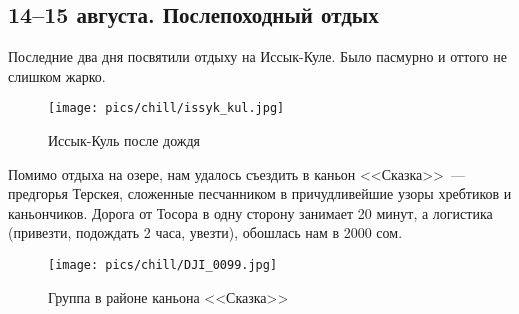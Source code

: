 \subsection{14--15 августа. Послепоходный отдых}

Последние два дня посвятили отдыху на Иссык-Куле. Было пасмурно и оттого не слишком жарко.

\begin{figure}[h!]
	\centering
	\texttt{[image: pics/chill/issyk\_kul.jpg]}
	\caption{Иссык-Куль после дождя}
	\label{fig:issyk_kul.jpg}
\end{figure}

Помимо отдыха на озере, нам удалось съездить в каньон <<Сказка>>~--- предгорья Терскея, сложенные песчанником в причудливейшие узоры хребтиков и каньончиков. Дорога от Тосора в одну сторону занимает 20 минут, а логистика (привезти, подождать 2 часа, увезти), обошлась нам в 2000 сом.


\begin{figure}[h!]
	\centering
	\texttt{[image: pics/chill/DJI\_0099.jpg]}
	\caption{Группа в районе каньона <<Сказка>>}
	\label{fig:DJI_0099.jpg}
\end{figure}